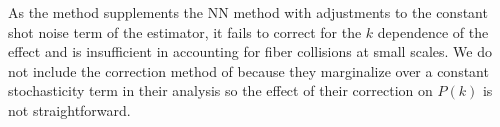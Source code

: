 \begin{figure*}
\begin{center}
{                                                                                                                                                                                                                                                                         As the \cite{Gil-Marin:2014aa} method supplements 
                                                                                                                                                                                                                                                                         the NN method with adjustments to the constant shot noise term of the estimator, 
                                                                                                                                                                                                                                                                         it fails to correct for the $k$ dependence of the effect and is insufficient 
                                                                                                                                                                                                                                                                         in accounting for fiber collisions at small scales. 
                                                                                                                                                                                                                                                                         We do not include the correction method of \cite{Beutler:2014aa} because they 
                                                                                                                                                                                                                                                                         marginalize over a constant stochasticity term in their analysis so the effect 
                                                                                                                                                                                                                                                                         of their correction on $P(k)$ is not straightforward.}

\end{center}
\end{figure*}
